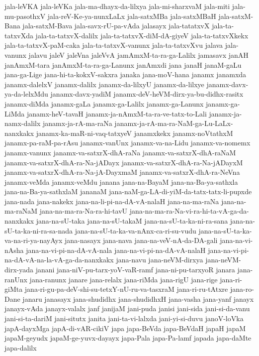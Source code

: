 {jala-leVKA
jala-leVKa
jala-ma-dhayx-da-lilxya
jala-mi-sharxvaM
jala-miti
jala-mu-pasothxV
jala-reV-Ke-ya-nunxLaLx
jala-satxMBa
jala-satxMBaH
jala-satxM-Bana
jala-satxM-Bava
jala-savx-rU-pa-vAda
jalasayx
jala-tatatxvX
jala-ta-tatxvXda
jala-ta-tatxvX-dalilx
jala-ta-tatxvX-diM-dA-giyeV
jala-ta-tatxvXkekx
jala-ta-tatxvX-paM-caka
jala-ta-tatxvX-vanunx
jala-ta-tatxvXvu
jalava
jala-vanunx
jalavu
jaleV
jaleVna
jaleVvA
jamAmxM-ta-ra-ga-Lalilx
jamasavx
janAH
janAmxM-tara
janAmxM-ta-ra-ga-Lanunx
janAmxdi
jana
janaH
janaM-gaLu
jana-ga-Lige
jana-hi-ta-kokxV-sakxra
janaka
jana-moV-hana
janamx
janamxda
janamx-dalelxV
janamx-dalilx
janamx-da-lilxyU
janamx-da-lilxye
janamx-davx-ya-da-lelxMdu
janamx-davx-yadiM
janamx-deV-heVM-dirx-ya-bu-didhx-rasitx
janamx-diMda
janamx-gaLa
janamx-ga-Lalilx
janamx-ga-Lanunx
janamx-ga-LiMda
janamx-heV-tavaH
janamx-ja-nAmxM-ta-ra-ve-tatx-to-Lali
janamx-ja-namx-dalilx
janamx-ja-rA-ma-raNa
janamx-ja-rA-ma-ra-NaM-ga-Lu-LaLx-nanxkakx
janamx-ka-maR-ni-vaq-tatxyeV
janamxkekx
janamx-noVtathxM
janamx-pa-raM-pa-rAsu
janamx-vanUnx
janamx-va-na-Lidu
janamx-va-nomemx
janamx-vanunx
janamx-va-satxrX-dhA-raNa
janamx-va-satxrX-dhA-raNaM
janamx-va-satxrX-dhA-ra-Na-jADayx
janamx-va-satxrX-dhA-ra-Na-jADayxM
janamx-va-satxrX-dhA-ra-Na-jA-DayxmaM
janamx-va-satxrX-dhA-ra-NeVna
janamx-veMda
janamx-veMdu
janana
jana-na-BayaM
jana-na-Ba-ya-sathxla
jana-na-Ba-ya-sathxlaM
jananaM
jana-naM-ga-LA-di-yiM-da-tatx-tatx-li-pupxde
jana-nada
jana-nakekx
jana-na-li-pi-na-dA-vA-nalaH
jana-na-ma-raNa
jana-na-ma-raNaM
jana-na-ma-ra-Na-ra-hi-tavU
jana-na-ma-ra-Na-vi-ra-hi-ta-vA-ga-da-nanxkakx
jana-na-sU-taka
jana-na-sU-takaM
jana-na-sU-ta-ka-ni-ra-sana
jana-na-sU-ta-ka-ni-ra-sa-nada
jana-na-sU-ta-ka-va-nAnx-ca-ri-su-vudu
jana-na-sU-ta-ka-va-na-ri-ya-nayAyx
jana-nasayx
jana-nava
jana-na-veV-nA-da-DA-gali
jana-na-vi-nAsha
jana-na-vi-pi-na-dA-vA-nala
jana-na-vi-pi-na-dA-vA-nalaH
jana-na-vi-pi-na-dA-vA-na-la-vA-ga-da-nanxkakx
jana-navu
jana-neVM-dirxya
jana-neVM-dirx-yada
janani
jana-niV-pu-tarx-yoV-vaR-ramf
jana-ni-pu-tarxyoR
janara
jana-ranUnx
jana-ranunx
janare
jana-relalx
jana-riMda
jana-rigU
jana-rige
jana-ri-giMta
jana-ri-gu-pa-deV-shi-su-tetxY-nU-ru-va-tasxraM
jana-ri-ru-tAtxre
jana-ro-Dane
janaru
janasayx
jana-shudidhx
jana-shudidhxH
jana-vasha
jana-yanf
janayx
janayx-vAda
janayx-valalx
janf
janijaM
jani-puda
janisi
jani-sida
jani-si-da-vanu
jani-si-ta-dariM
jani-situtx
janita
jani-ta-vi-lalxda
jani-yi-si-duvu
janoV-loVka
japA-dayxMga
japA-di-vAR-cikiV
japa
japa-BeVda
japa-BeVdaH
japaH
japaM
japaM-geyudx
japaM-ge-yuvx-dayayx
japa-Pala
japa-Pa-lamf
japada
japa-daMte
japa-dalilx
}
